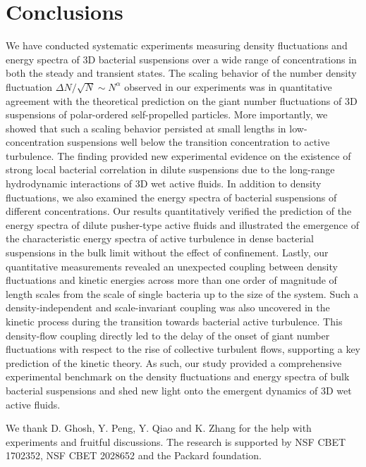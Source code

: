 \documentclass[twocolumn,aps,prx,amsmath,amssymb,longbibliography,superscriptaddress]{revtex4-2}
\begin{document}
\section{Conclusions}

We have conducted systematic experiments measuring density fluctuations and energy spectra of 3D bacterial suspensions over a wide range of concentrations in both the steady and transient states. The scaling behavior of the number density fluctuation $\Delta N/\sqrt N \sim N^\alpha$ observed in our experiments was in quantitative agreement with the theoretical prediction on the giant number fluctuations of 3D suspensions of polar-ordered self-propelled particles. More importantly, we showed that such a scaling behavior persisted at small lengths in low-concentration suspensions well below the transition concentration to active turbulence. The finding provided new experimental evidence on the existence of strong local bacterial correlation in dilute suspensions due to the long-range hydrodynamic interactions of 3D wet active fluids. In addition to density fluctuations, we also examined the energy spectra of bacterial suspensions of different concentrations. Our results quantitatively verified the prediction of the energy spectra of dilute pusher-type active fluids and illustrated the emergence of the characteristic energy spectra of active turbulence in dense bacterial suspensions in the bulk limit without the effect of confinement. Lastly, our quantitative measurements revealed an unexpected coupling between density fluctuations and kinetic energies across more than one order of magnitude of length scales from the scale of single bacteria up to the size of the system. Such a density-independent and scale-invariant coupling was also uncovered in the kinetic process during the transition towards bacterial active turbulence. This density-flow coupling directly led to the delay of the onset of giant number fluctuations with respect to the rise of collective turbulent flows, supporting a key prediction of the kinetic theory. As such, our study provided a comprehensive experimental benchmark on the density fluctuations and energy spectra of bulk bacterial suspensions and shed new light onto the emergent dynamics of 3D wet active fluids.

\begin{acknowledgements}
	We thank D. Ghosh, Y. Peng, Y. Qiao and K. Zhang for the help with experiments and fruitful discussions. The research is supported by NSF CBET 1702352, NSF CBET 2028652 and the Packard foundation.
\end{acknowledgements}
\end{document}
